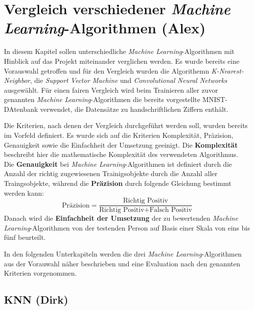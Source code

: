 \section{Vergleich verschiedener \textit{Machine Learning}-Algorithmen (Alex)}
In diesem Kapitel sollen unterschiedliche \textit{Machine Learning}-Algorithmen mit Hinblick auf das Projekt miteinander verglichen werden.
Es wurde bereits eine Vorauswahl getroffen und für den Vergleich wurden die Algorithemn \textit{K-Nearest-Neighbor}, die \textit{Support Vector Machine} und
\textit{Convolutional Neural Networks} ausgewählt. Für einen fairen Vergleich wird beim Trainieren aller zuvor genannten \textit{Machine Learning}-Algorithmen
die bereits vorgestellte MNIST-DAtenbank verwendet, die Datensätze zu handschriftlichen Ziffern enthält.

Die Kriterien, nach denen der Vergleich durchgeführt werden soll, wurden bereits im Vorfeld definiert. Es wurde sich auf die Kriterien Komplexität,
Präzision, Genauigkeit sowie die Einfachheit der Umsetzung geeinigt. Die \textbf{Komplexität} beschreibt hier die mathematische Komplexität des verwendeten Algorithmus.
Die \textbf{Genauigkeit} bei \textit{Machine Learning}-Algorithmen ist definiert durch die Anzahl der richtig zugewiesenen Trainigsobjekte durch die Anzahl aller
Traingsobjekte, während die \textbf{Präzision} durch folgende Gleichung bestimmt werden kann:
\[ \text{Präzision} = \frac{\text{Richtig Positiv}}{\text{Richtig Positiv} + \text{Falsch Positiv}} \]
Danach wird die \textbf{Einfachheit der Umsetzung} der zu bewertenden \textit{Machine Learning}-Algorithmen von der testenden Person auf Basis einer Skala von
eins bis fünf beurteilt.

In den folgenden Unterkapiteln werden die drei \textit{Machine Learning}-Algorithmen aus der Vorauwahl näher beschrieben und eine Evaluation nach den genannten 
Kriterien vorgenommen.

\subsection{KNN (Dirk)}

